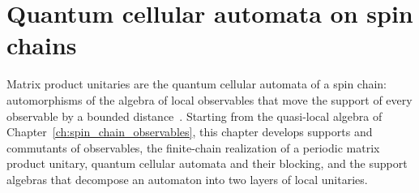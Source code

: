 \chapter{Quantum cellular automata on spin chains}
\label{ch:mpu_qca}

Matrix product unitaries are the quantum cellular automata of a spin chain:
automorphisms of the algebra of local observables that move the support of
every observable by a bounded distance~\cite{Cirac2017MPU}. Starting from
the quasi-local algebra of Chapter~\ref{ch:spin_chain_observables}, this
chapter develops supports and commutants of observables, the finite-chain
realization of a periodic matrix product unitary, quantum cellular automata and
their blocking, and the support algebras that decompose an automaton into
two layers of local unitaries.









